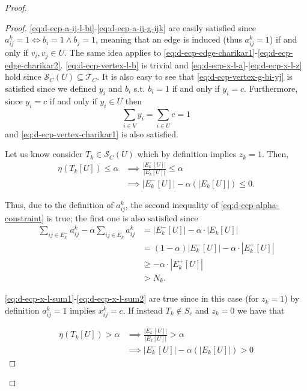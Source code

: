 \begin{proof}
\begin{proof}
		\eqref{eq:d-ecp-a-ij-l-bi}-\eqref{eq:d-ecp-a-ij-g-ijk} are easily
		satisfied since $a_{ij}^{k} = 1 \iff b_i = 1 \land b_j = 1$, meaning
		that an edge is induced (thus $a_{ij}^{k} = 1$) if and only if $ v_i,
			v_j \in U$. The same idea applies to
		\eqref{eq:d-ecp-edge-charikar1}-\eqref{eq:d-ecp-edge-charikar2}.
		\eqref{eq:d-ecp-vertex-l-b} is trivial and
		\eqref{eq:d-ecp-x-l-a}-\eqref{eq:d-ecp-x-l-z} hold since
		$\mathcal{S}_C(U) \subseteq \mathcal{T}_C $. It is also easy to see that
		\eqref{eq:d-ecp-vertex-g-bi-yj} is satisfied since we defined $y_i$
		and $b_i$ s.t. $b_i = 1$ if and only if $y_i = c$. Furthermore, since
		$y_i = c$ if and only if $
			y_i \in U$ then
		\begin{equation*}
			\sum^{}_{i \in V} y_i = \sum^{}_{i \in U} c = 1
		\end{equation*}
		and \eqref{eq:d-ecp-vertex-charikar1} is also satisfied.

		Let us know consider $T_k \in \mathcal{S}_C(U)$ which by definition
		implies $z_k = 1$. Then,
		\begin{align}
			\eta(T_k[U]) \leq \alpha & \implies
			\frac{|E^{-}_{k}[U]|}{|E_{k}[U]|} \leq \alpha               \\
			                         & \implies |E^{-}_{k}[U]| - \alpha
			(|E_{k}[U]|) \leq 0.
		\end{align}

		Thus, due to the definition of $a_{ij}^k$, the second inequality of \eqref{eq:d-ecp-alpha-constraint} is true;
		the first one is also satisfied since
		\begin{align}
			\sum^{}_{ij \in E^-_k} a_{ij}^{k}  - \alpha \sum^{}_{ij \in E_k}
			a_{ij} ^{k} & = |E^{-}_{k}[U]| - \alpha \cdot |E_{k}[U]| \\
			            & = (1- \alpha)|E^{-}_{k}[U]| - \alpha \cdot
			|E^{+}_{k}[U]|                                           \\
			            & \geq - \alpha \cdot |E^{+}_{k}[U]|         \\
			            & > N_k.
		\end{align}

		\eqref{eq:d-ecp-x-l-sum1}-\eqref{eq:d-ecp-x-l-sum2} are true
		since in this case (for $z_k = 1$) by definition $a_{ij}^{k} = 1
		$ implies $x_{ij}^{k} = c$. If instead $T_k \not\in S_c$ and $z_k = 0$ we
		have that

		\begin{align}
			\eta(T_k[U]) > \alpha & \implies
			\frac{|E^{-}_{k}[U]|}{|E_{k}[U]|} > \alpha                                \\
			                      & \implies |E^{-}_{k}[U]| - \alpha (|E_{k}[U]|) > 0
		\end{align}


\end{proof}
\end{proof}
